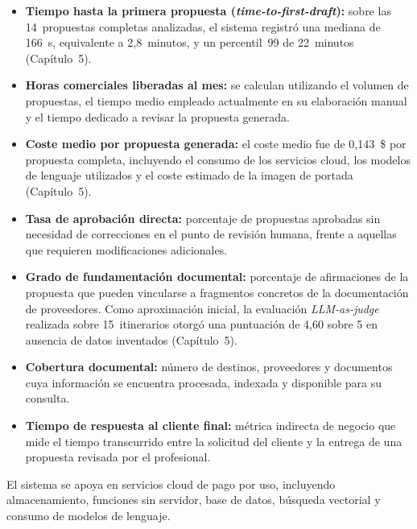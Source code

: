 \begin{itemize}

\item \textbf{Tiempo hasta la primera propuesta
(\textit{time-to-first-draft}):}
sobre las 14~propuestas completas analizadas, el sistema registró una mediana de
166~s, equivalente a 2,8~minutos, y un percentil~99 de 22~minutos
(Capítulo~5).

\item \textbf{Horas comerciales liberadas al mes:}
se calculan utilizando el volumen de propuestas, el tiempo medio empleado actualmente
en su elaboración manual y el tiempo dedicado a revisar la propuesta generada.

\item \textbf{Coste medio por propuesta generada:}
el coste medio fue de 0,143~\$ por propuesta completa, incluyendo el consumo de
los servicios cloud, los modelos de lenguaje utilizados y el coste estimado de la
imagen de portada (Capítulo~5).

\item \textbf{Tasa de aprobación directa:}
porcentaje de propuestas aprobadas sin necesidad de correcciones en el punto de revisión
humana, frente a aquellas que requieren modificaciones adicionales.

\item \textbf{Grado de fundamentación documental:}
porcentaje de afirmaciones de la propuesta que pueden vincularse a fragmentos concretos
de la documentación de proveedores. Como aproximación inicial, la evaluación
\textit{LLM-as-judge} realizada sobre 15~itinerarios otorgó una puntuación de
4,60 sobre 5 en ausencia de datos inventados (Capítulo~5).

\item \textbf{Cobertura documental:}
número de destinos, proveedores y documentos cuya información se encuentra procesada,
indexada y disponible para su consulta.

\item \textbf{Tiempo de respuesta al cliente final:}
métrica indirecta de negocio que mide el tiempo transcurrido entre la solicitud del
cliente y la entrega de una propuesta revisada por el profesional.

\end{itemize}


El sistema se apoya en servicios cloud de pago por uso, incluyendo almacenamiento,
funciones sin servidor, base de datos, búsqueda vectorial y consumo de modelos de
lenguaje.

